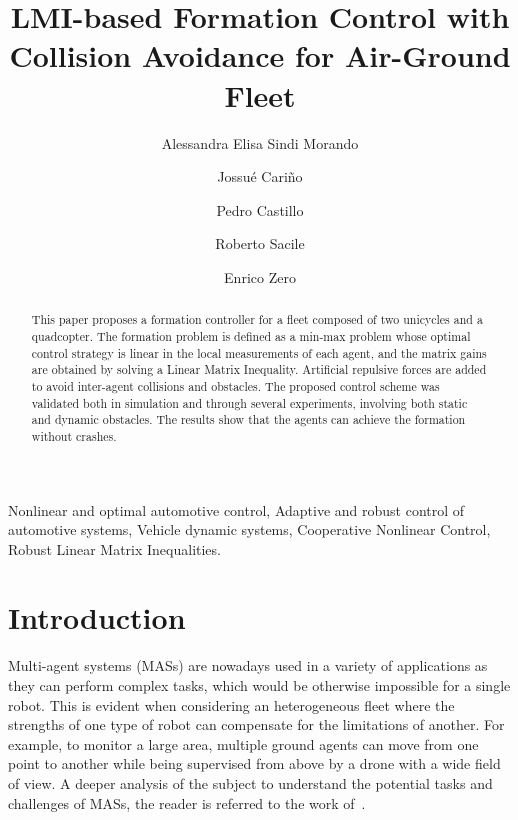 \documentclass{ifacconf}
\begin{document}
\begin{frontmatter}

\title{LMI-based Formation Control with Collision Avoidance for Air-Ground Fleet} 

\author[First,Second]{Alessandra Elisa Sindi Morando} 
\author[Second]{Jossué Cari\~no}
\author[Second]{Pedro Castillo} 
\author[First]{Roberto Sacile}
\author[First]{Enrico Zero}

\address[First]{
   \textit{University of Genoa}, Genoa, Italy \\
   alessandra.elisa.sindi.morando@edu.unige.it, roberto.sacile@unige.it, enrico.zero@dibris.unige.it
}
\address[Second]{
   \textit{Université de technologie de Compiègne}, CNRS, Heudiasyc, Compiègne, France \\
   alessandra-elisa-sindi.morando@utc.fr, \{jossue.escobar, pedro.castillo\}@hds.utc.fr
}

\begin{abstract}                %
This paper proposes a formation controller for a fleet composed of two unicycles and a quadcopter.
The formation problem is defined as a min-max problem whose optimal control strategy is linear 
in the local measurements of each agent, and the matrix gains are obtained by solving a Linear Matrix Inequality.
Artificial repulsive forces are added to avoid inter-agent collisions and obstacles.
The proposed control scheme was validated both in simulation and through several experiments, involving both static and dynamic obstacles.
The results show that the agents can achieve the formation without crashes.
\end{abstract}
\begin{keyword}
    Nonlinear and optimal automotive control,
    Adaptive and robust control of automotive systems,
    Vehicle dynamic systems,
    Cooperative Nonlinear Control, 
    Robust Linear Matrix Inequalities.
\end{keyword}

\end{frontmatter}

\section{Introduction}
Multi-agent systems (MASs) are nowadays used in a variety of applications as
they can perform complex tasks, which would be otherwise impossible for a single robot.
This is evident when considering an heterogeneous fleet where the strengths
of one type of robot can compensate for the limitations of another.
For example, to monitor a large area, multiple ground agents can move from one point 
to another while being supervised from above by a drone with a wide field of view.
A deeper analysis of the subject to understand the potential tasks and challenges of MASs,
the reader is referred to the work of~\cite{Maldonado2024}.
\end{document}
